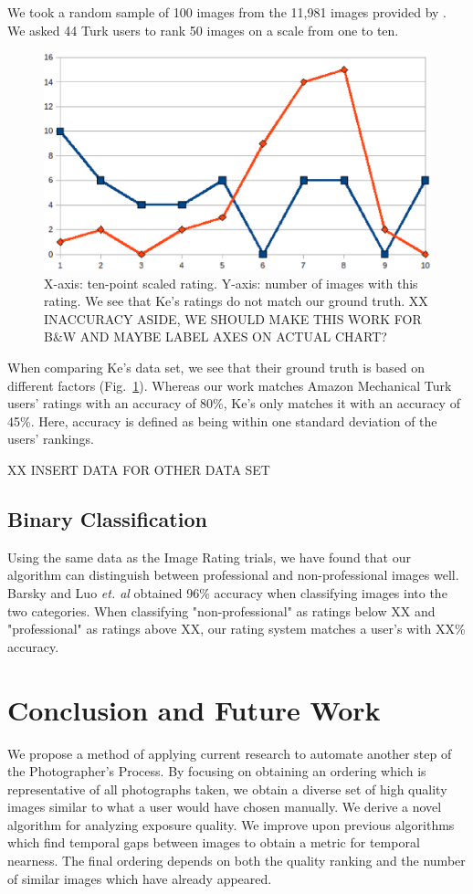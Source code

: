 \documentclass{article}
\begin{document}
We took a random sample of 100 images from the 11,981 images provided by \cite{springerlink:10.1007/978-3-540-88690-7_29}. We asked 44 Turk users to rank 50 images on a scale from one to ten.

\begin{figure}
  \centering
    \includegraphics[scale=0.40,clip]{ke_vs_us.eps}
  \caption{X-axis: ten-point scaled rating.  Y-axis: number of images with this rating. We see that Ke's ratings do not match our ground truth. XX INACCURACY ASIDE, WE SHOULD MAKE THIS WORK FOR B\&W AND MAYBE LABEL AXES ON ACTUAL CHART?}
  \label{fig:ke_vs_us}
\end{figure}
When comparing Ke's data set, we see that their ground truth is based on different factors (Fig.~\ref{fig:ke_vs_us}). Whereas our work matches Amazon Mechanical Turk users' ratings with an accuracy of 80\%, Ke's only matches it with an accuracy of 45\%. Here, accuracy is defined as being within one standard deviation of the users' rankings.

XX INSERT DATA FOR OTHER DATA SET

\subsection{Binary Classification} Using the same data as the Image Rating trials, we have found that our algorithm can distinguish between professional and non-professional images well. Barsky \cite{Yeh:2010:PPR:1873951.1873963} and Luo \emph{et. al}\cite{springerlink:10.1007/978-3-540-88690-7_29} obtained 96\% accuracy when classifying images into the two categories. When classifying "non-professional" as ratings below XX and "professional" as ratings above XX, our rating system matches a user's with XX\% accuracy.

\section{Conclusion and Future Work}
We propose a method of applying current research to automate another step of the Photographer's Process. By focusing on obtaining an ordering which is representative of all photographs taken, we obtain a diverse set of high quality images similar to what a user would have chosen manually. We derive a novel algorithm for analyzing exposure quality. We improve upon previous algorithms which find temporal gaps between images to obtain a metric for temporal nearness. The final ordering depends on both the quality ranking and the number of similar images which have already appeared.
\end{document}
